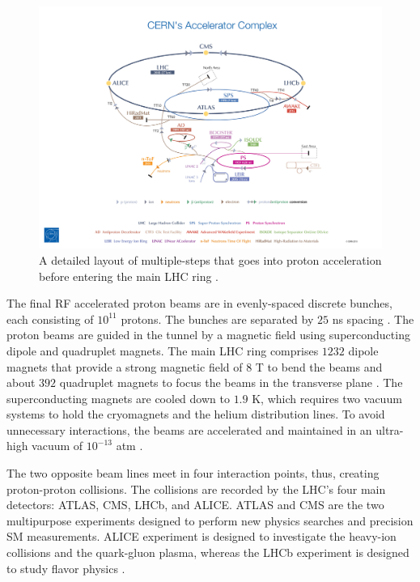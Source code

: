 \begin{figure}
    \centering
    \includegraphics[width=.98\linewidth]{figures/LHC/ProtonAccelerator.jpeg}
    \caption{ A detailed layout of multiple-steps that goes into proton acceleration before entering the main LHC ring \cite{ProtonAcclerator}.\label{fig:ProtonAcc}}
\end{figure}

The final RF accelerated proton beams are in evenly-spaced discrete bunches, each consisting of $10^{11}$ protons. The bunches are separated by $25$ ns spacing \cite{LHCGuide}. The proton beams are guided in the tunnel by a magnetic field using superconducting dipole and quadruplet magnets. The main LHC ring comprises $1232$ dipole magnets that provide a strong magnetic field of $8$ T to bend the beams and about $392$ quadruplet magnets to focus the beams in the transverse plane \cite{LHCGuide}. The superconducting magnets are cooled down to $1.9$ K, which requires two vacuum systems to hold the cryomagnets and the helium distribution lines. To avoid unnecessary interactions, the beams are accelerated and maintained in an ultra-high vacuum of $10^{-13}$ atm \cite{LHCGuide}. 

The two opposite beam lines meet in four interaction points, thus, creating proton-proton collisions. The collisions are recorded by the LHC's four main detectors: ATLAS, CMS, LHCb, and ALICE. ATLAS and CMS are the two multipurpose experiments designed to perform new physics searches and precision SM measurements. ALICE experiment is designed to investigate the heavy-ion collisions and the quark-gluon plasma, whereas the LHCb experiment is designed to study flavor physics \cite{LHCGuide}.